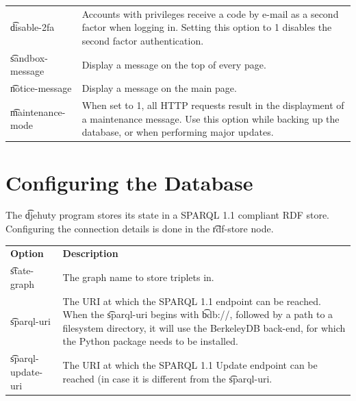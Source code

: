 \begin{tabularx}{\textwidth}{*{1}{!{\VRule[-1pt]}l}!{\VRule[-1pt]}X}
  \t{disable-2fa}            & Accounts with privileges receive a code by e-mail
                               as a second factor when logging in.  Setting this
                               option to 1 disables the second factor
                               authentication.\\
  \t{sandbox-message}        & Display a message on the top of every page.\\
  \t{notice-message}         & Display a message on the main page.\\
  \t{maintenance-mode}       & When set to 1, all HTTP requests result in the
                               displayment of a maintenance message. Use this
                               option while backing up the database, or when
                               performing major updates.
\end{tabularx}

\section{Configuring the Database}

  The \t{djehuty} program stores its state in a SPARQL 1.1 compliant
  RDF store.  Configuring the connection details is done in the
  \t{rdf-store} node.

\begin{tabularx}{\textwidth}{*{1}{!{\VRule[-1pt]}l}!{\VRule[-1pt]}X}
  \headrow
  \textbf{Option}            & \textbf{Description}\\
  \t{state-graph}            & The graph name to store triplets in.\\
  \t{sparql-uri}             & The URI at which the SPARQL 1.1 endpoint can
                               be reached.\newline\newline
                               When the \t{sparql-uri} begins with \t{bdb://},
                               followed by a path to a filesystem directory,
                               it will use the BerkeleyDB back-end, for which
                               the  Python package needs to
                               be installed.\\
  \t{sparql-update-uri}      & The URI at which the SPARQL 1.1 Update endpoint
                               can be reached (in case it is different from
                               the \t{sparql-uri}.
\end{tabularx}

